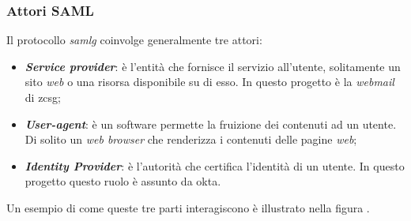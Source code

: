 \subsubsection{Attori SAML}
Il protocollo \textit{\gls{samlg}} coinvolge generalmente tre attori:
\begin{itemize}
    \item \textit{\textbf{Service provider}}: è l'entità che fornisce il servizio all'utente, solitamente un sito \textit{web} o una risorsa disponibile su di esso. In questo progetto è la \textit{webmail} di \gls{zcsg};
    \item \textit{\textbf{User-agent}}: è un software permette la fruizione dei contenuti ad un utente. Di solito un \textit{web browser} che renderizza i contenuti delle pagine \textit{web};
    \item \textit{\textbf{Identity Provider}}: è l'autorità che certifica l'identità di un utente. In questo progetto questo ruolo è assunto da \gls{okta}.
\end{itemize}
Un esempio di come queste tre parti interagiscono è illustrato nella figura .

